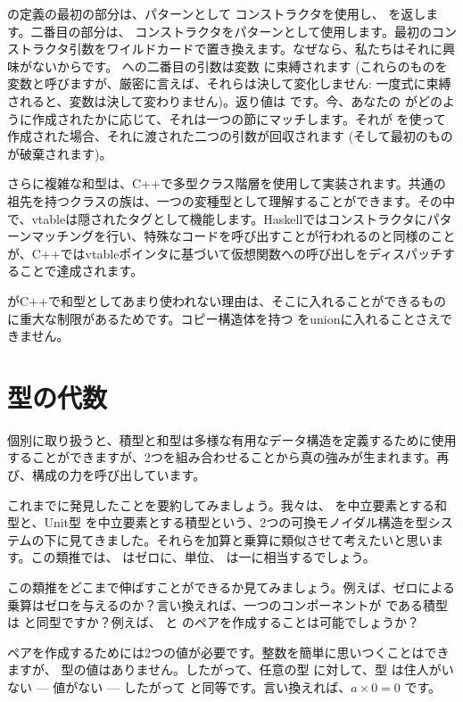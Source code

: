 の定義の最初の部分は、パターンとして  コンストラクタを使用し、 を返します。二番目の部分は、 コンストラクタをパターンとして使用します。最初のコンストラクタ引数をワイルドカードで置き換えます。なぜなら、私たちはそれに興味がないからです。  への二番目の引数は変数  に束縛されます (これらのものを変数と呼びますが、厳密に言えば、それらは決して変化しません: 一度式に束縛されると、変数は決して変わりません)。返り値は  です。今、あなたの  がどのように作成されたかに応じて、それは一つの節にマッチします。それが  を使って作成された場合、それに渡された二つの引数が回収されます (そして最初のものが破棄されます)。

さらに複雑な和型は、C++で多型クラス階層を使用して実装されます。共通の祖先を持つクラスの族は、一つの変種型として理解することができます。その中で、vtableは隠されたタグとして機能します。Haskellではコンストラクタにパターンマッチングを行い、特殊なコードを呼び出すことが行われるのと同様のことが、C++ではvtableポインタに基づいて仮想関数への呼び出しをディスパッチすることで達成されます。

 がC++で和型としてあまり使われない理由は、そこに入れることができるものに重大な制限があるためです。コピー構造体を持つ  をunionに入れることさえできません。

\section{型の代数}

個別に取り扱うと、積型と和型は多様な有用なデータ構造を定義するために使用することができますが、2つを組み合わせることから真の強みが生まれます。再び、構成の力を呼び出しています。

これまでに発見したことを要約してみましょう。我々は、 を中立要素とする和型と、Unit型 \code{()} を中立要素とする積型という、2つの可換モノイダル構造を型システムの下に見てきました。それらを加算と乗算に類似させて考えたいと思います。この類推では、 はゼロに、単位、\code{()} は一に相当するでしょう。

この類推をどこまで伸ばすことができるか見てみましょう。例えば、ゼロによる乗算はゼロを与えるのか？言い換えれば、一つのコンポーネントが  である積型は  と同型ですか？例えば、 と  のペアを作成することは可能でしょうか？

ペアを作成するためには2つの値が必要です。整数を簡単に思いつくことはできますが、  型の値はありません。したがって、任意の型  に対して、型  は住人がいない --- 値がない --- したがって  と同等です。言い換えれば、$a \times 0 = 0$ です。

